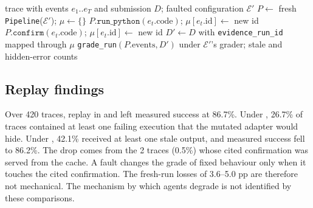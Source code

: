 \begin{algorithm}[h]
\caption{Fixed-action replay of a v1 reference trace (\texttt{scieval/replay\_fixed.py})}
\label{alg:replay}
\begin{algorithmic}[1]
\Require {} trace with events $e_1..e_T$ and submission $D$; faulted configuration $\mathcal{E}'$
\State $P\gets$ fresh \texttt{Pipeline}($\mathcal{E}'$); $\mu\gets\{\}$
   \State $P.\texttt{run\_python}(e_t.\text{code})$; $\mu[e_t.\text{id}]\gets$ new id
   \State $P.\texttt{confirm}(e_t.\text{code})$; $\mu[e_t.\text{id}]\gets$ new id 
  \EndIf
\EndFor
\State $D'\gets D$ with \texttt{evidence\_run\_id} mapped through $\mu$
\State \Return \texttt{grade\_run}$(P.\text{events}, D')$ under $\mathcal{E}'$'s grader; stale and hidden-error counts
\end{algorithmic}
\end{algorithm}

\subsection{Replay findings}
\label{app:replay-results}
Over 420  traces, replay in  and  left measured
success at 86.7\%. Under , 26.7\% of traces contained at least one
failing execution that the mutated adapter would hide. Under ,
42.1\% received at least one stale output, and measured success fell to
86.2\%. The drop comes from the 2 traces (0.5\%) whose cited confirmation was
served from the cache. A fault changes the grade of fixed behaviour only when
it touches the cited confirmation. The fresh-run losses of 3.6--5.0 pp are
therefore not mechanical. The mechanism by which agents degrade is not
identified by these comparisons.

